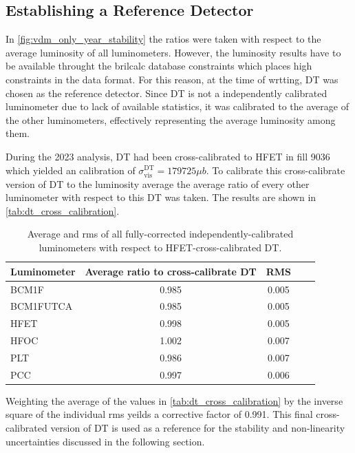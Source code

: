 \subsection{Establishing a Reference Detector}

In \autoref{fig:vdm_only_year_stability} the ratios were taken with respect to the average luminosity of all luminometers. However, the luminosity results have to be available throught the brilcalc database constraints which places high constraints in the data format. For this reason, at the time of wrtting, DT was chosen as the reference detector. Since DT is not a independently calibrated luminometer due to lack of available statistics, it was calibrated to the average of the other luminometers, effectively representing the average luminosity among them.

During the 2023 analysis, DT had been cross-calibrated to HFET in fill 9036 which yielded an calibration of $\sigma^{\text{DT}}_{\mathrm{vis}} = 179725 \mu b$. To calibrate this cross-calibrate version of DT to the luminosity average the average ratio of every other luminometer with respect to this DT was taken. The results are shown in \autoref{tab:dt_cross_calibration}.

\begin{table}[!htb]
	\caption{Average and rms of all fully-corrected independently-calibrated luminometers with respect to HFET-cross-calibrated DT.}
	
	\label{tab:dt_cross_calibration}
	\centering
	\begin{tabular}{lcccc}
		\hline
		Luminometer & Average ratio to cross-calibrate DT & RMS \\
		\hline
		BCM1F     & 0.985 & 0.005 \\
		BCM1FUTCA & 0.985 & 0.005 \\
		HFET      & 0.998 & 0.005 \\
		HFOC      & 1.002 & 0.007 \\
		PLT       & 0.986 & 0.007 \\
		PCC       & 0.997 & 0.006 \\
		\hline
	\end{tabular}
\end{table}

Weighting the average of the values in \autoref{tab:dt_cross_calibration} by the inverse square of the individual rms yeilds a corrective factor of 0.991. This final cross-calibrated version of DT is used as a reference for the stability and non-linearity uncertainties discussed in the following section.

